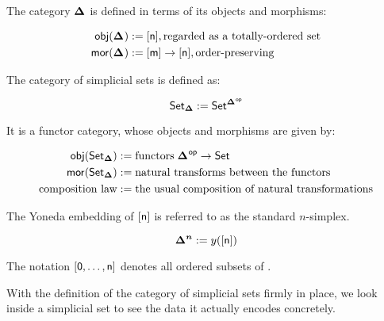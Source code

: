 \documentclass[10pt]{art}
\begin{document}
\begin{definition}[\Simplex{}]
  The category $\boldsymbol{\Delta^{}}$ is defined in terms of its objects and morphisms:

  \begin{align*}
    \mathsf{obj}(\boldsymbol{\Delta^{}}) & := \mathsf{[n]}, \text{regarded as a totally-ordered set}   \\
    \mathsf{mor}(\boldsymbol{\Delta^{}}) & := \mathsf{[m]} \rightarrow \mathsf{[n]}, \text{order-preserving}
  \end{align*}
\end{definition}

\begin{definition}[\SSet]
  The category of simplicial sets is defined as:

  \begin{equation*}
    \mathsf{Set}_{\boldsymbol{\Delta}} := \mathsf{Set}^{{\boldsymbol{\Delta^{}}}^\mathsf{op}}
  \end{equation*}

  It is a functor category, whose objects and morphisms are given by:

  \begin{align*}
    \mathsf{obj}(\mathsf{Set}_{\boldsymbol{\Delta}})            & := \text{functors} \; {\boldsymbol{\Delta^{}}}^\mathsf{op} \rightarrow \mathsf{Set}     \\
    \mathsf{mor}(\mathsf{Set}_{\boldsymbol{\Delta}})            & := \text{natural transforms between the functors}          \\
    \text{composition law} & := \text{the usual composition of natural transformations} \\
  \end{align*}
\end{definition}

\begin{definition}[\Simplex{n}]
  The Yoneda embedding of $\mathsf{[n]}$ is referred to as the standard $n$-simplex.

  \begin{equation*}
    \boldsymbol{\Delta^{n}} := y(\mathsf{[n]})
  \end{equation*}
\end{definition}

\begin{notation}[$\sq{0, \ldots, n}$]
  The notation $\sq{0, \ldots, n}$ denotes all ordered subsets of .
\end{notation}

With the definition of the category of simplicial sets firmly in place, we look inside a simplicial set to see the data it actually encodes concretely.
\end{document}
